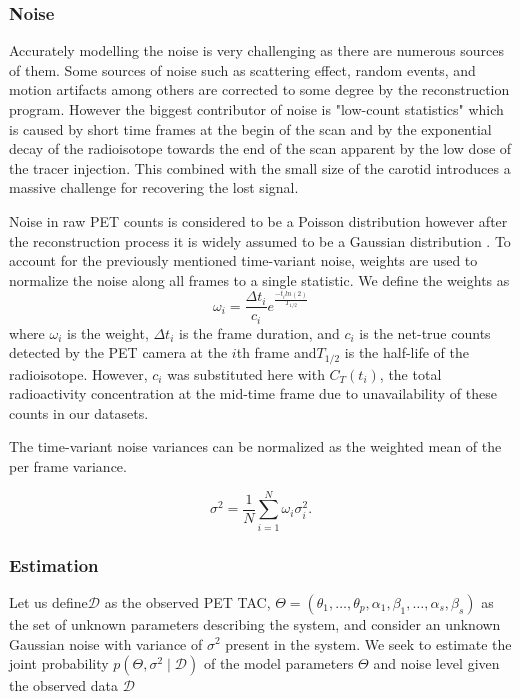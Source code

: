 \subsubsection{Noise}
Accurately modelling the noise is very challenging as there are numerous sources of them.
Some sources of noise such as scattering effect, random events, and motion artifacts among others are corrected to some degree by the reconstruction program.
However the biggest contributor of noise is "low-count statistics" which is caused by short time frames at the begin of the scan and by the exponential decay of the radioisotope towards the end of the scan apparent by the low dose of the tracer injection.
This combined with the small size of the carotid introduces a massive challenge for recovering the lost signal.

Noise in raw PET counts is considered to be a Poisson distribution however after the reconstruction process it is widely assumed to be a Gaussian distribution \cite{TODO}. To account for the previously mentioned time-variant noise, weights are used to normalize the noise along all frames to a single statistic. We define the weights as
\[
	\omega_{i} = \frac{\Delta t_i}{c_i} e^{\frac{-t_{i} ln(2)}{T_{1/2}}}
\]
where \(\omega_i\) is the weight, \(\Delta t_i\) is the frame duration, and \(c_i\) is the net-true counts detected by the PET camera at the \(i\)th frame and\(T_{1/2}\) is the half-life of the radioisotope.  
However, \(c_i\) was substituted here with \(C_T(t_i)\), the total radioactivity concentration at the mid-time frame due to unavailability of these counts in our datasets.

The time-variant noise variances can be normalized as the weighted mean of the per frame variance.

\[
	\sigma^2= \frac{1}{N} \sum_{i=1}^{N} \omega_i \sigma_i^2.
\]


\subsubsection{Estimation}
Let us define\(\mathcal{D}\) as the observed PET TAC, \( \Theta = (\theta_{1}, \dots,\theta_{p}, \alpha_{1}, \beta_{1}, \dots, \alpha_{s}, \beta_{s}) \) as the set of unknown parameters describing the system, and consider an unknown Gaussian noise with variance of $\sigma^2$ present in the system.  
We seek to estimate the joint probability \(p(\Theta,\sigma^2\mid \mathcal{D})\) of the model parameters \(\Theta\) and noise level given the observed data \(\mathcal{D}\)

